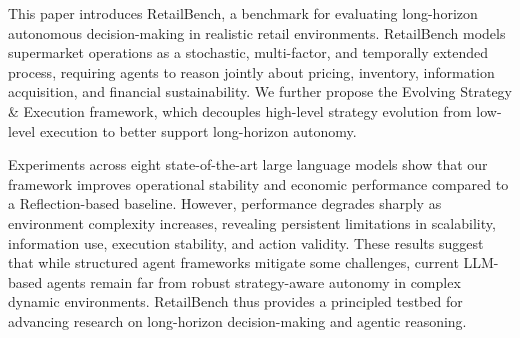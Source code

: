 This paper introduces RetailBench, a benchmark for evaluating long-horizon autonomous decision-making in realistic retail environments. RetailBench models supermarket operations as a stochastic, multi-factor, and temporally extended process, requiring agents to reason jointly about pricing, inventory, information acquisition, and financial sustainability. We further propose the Evolving Strategy \& Execution framework, which decouples high-level strategy evolution from low-level execution to better support long-horizon autonomy.

Experiments across eight state-of-the-art large language models show that our framework improves operational stability and economic performance compared to a Reflection-based baseline. However, performance degrades sharply as environment complexity increases, revealing persistent limitations in scalability, information use, execution stability, and action validity. These results suggest that while structured agent frameworks mitigate some challenges, current LLM-based agents remain far from robust strategy-aware autonomy in complex dynamic environments. RetailBench thus provides a principled testbed for advancing research on long-horizon decision-making and agentic reasoning.